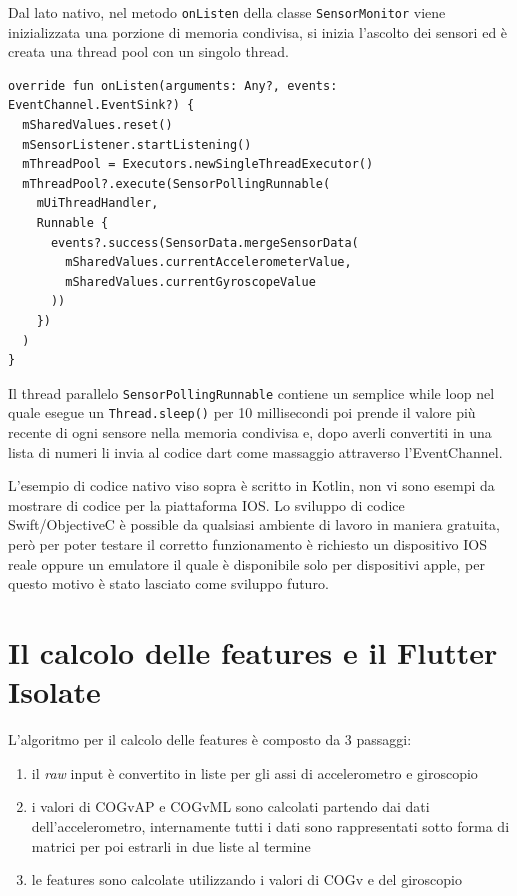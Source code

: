 Dal lato nativo, nel metodo \texttt{onListen} della classe \texttt{SensorMonitor} viene inizializzata una porzione di memoria condivisa, si inizia l'ascolto dei sensori ed è creata una thread pool con un singolo thread.
\begin{verbatim}
override fun onListen(arguments: Any?, events: EventChannel.EventSink?) {
  mSharedValues.reset()
  mSensorListener.startListening()
  mThreadPool = Executors.newSingleThreadExecutor()
  mThreadPool?.execute(SensorPollingRunnable(
    mUiThreadHandler,
    Runnable {
      events?.success(SensorData.mergeSensorData(
        mSharedValues.currentAccelerometerValue,
        mSharedValues.currentGyroscopeValue
      ))
    })
  )
}
\end{verbatim}
Il thread parallelo \texttt{SensorPollingRunnable} contiene un semplice while loop nel quale esegue un \texttt{Thread.sleep()} per 10 millisecondi poi prende il valore più recente di ogni sensore nella memoria condivisa e, dopo averli convertiti in una lista di numeri li invia al codice dart come massaggio attraverso l'EventChannel.

L'esempio di codice nativo viso sopra è scritto in Kotlin, non vi sono esempi da mostrare di codice per la piattaforma IOS. Lo sviluppo di codice Swift/ObjectiveC è possible da qualsiasi ambiente di lavoro in maniera gratuita, però per poter testare il corretto funzionamento è richiesto un dispositivo IOS reale oppure un emulatore il quale è disponibile solo per dispositivi apple, per questo motivo è stato lasciato come sviluppo futuro.

\section{Il calcolo delle features e il Flutter Isolate}

L'algoritmo per il calcolo delle features è composto da 3 passaggi:
\begin{enumerate}
  \item il {\itshape raw} input è convertito in liste per gli assi di accelerometro e giroscopio
  \item i valori di COGvAP e COGvML sono calcolati partendo dai dati dell'accelerometro, internamente tutti i dati sono rappresentati sotto forma di matrici per poi estrarli in due liste al termine 
  \item le features sono calcolate utilizzando i valori di COGv e del giroscopio
\end{enumerate}

